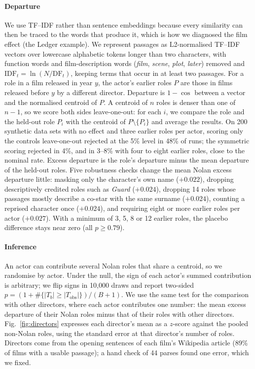 \documentclass[9pt,twocolumn,twoside]{pnas-new}
\begin{document}
{\paragraph*{Departure} We use TF--IDF rather than sentence embeddings because every similarity can then be traced to the words that produce it, which is how we diagnosed the film effect (the Ledger example). We represent passages as L2-normalised TF--IDF vectors over lowercase alphabetic tokens longer than two characters, with function words and film-description words (\emph{film}, \emph{scene}, \emph{plot}, \emph{later}) removed and $\mathrm{IDF}_t = \ln(N/\mathrm{DF}_t)$, keeping terms that occur in at least two passages. For a role in a film released in year $y$, the actor's earlier roles $P$ are those in films released before $y$ by a different director. Departure is $1 - \cos$ between a vector and the normalised centroid of $P$. A centroid of $n$ roles is denser than one of $n - 1$, so we score both sides leave-one-out: for each $i$, we compare the role and the held-out role $P_i$ with the centroid of $P \setminus \{P_i\}$ and average the results. On 200 synthetic data sets with no effect and three earlier roles per actor, scoring only the controls leave-one-out rejected at the 5\% level in 48\% of runs; the symmetric scoring rejected in 4\%, and in 3--8\% with four to eight earlier roles, close to the nominal rate. Excess departure is the role's departure minus the mean departure of the held-out roles. Five robustness checks change the mean Nolan excess departure little: masking only the character's own name ($+0.022$), dropping descriptively credited roles such as \emph{Guard} ($+0.024$), dropping 14 roles whose passages mostly describe a co-star with the same surname ($+0.024$), counting a reprised character once ($+0.024$), and requiring eight or more earlier roles per actor ($+0.027$). With a minimum of 3, 5, 8 or 12 earlier roles, the placebo difference stays near zero (all $p \geq 0.79$).

\paragraph*{Inference} An actor can contribute several Nolan roles that share a centroid, so we randomise by actor. Under the null, the sign of each actor's summed contribution is arbitrary; we flip signs in 10{,}000 draws and report two-sided $p = (1 + \#\{|T_b| \geq |T_{\mathrm{obs}}|\})/(B + 1)$. We use the same test for the comparison with other directors, where each actor contributes one number: the mean excess departure of their Nolan roles minus that of their roles with other directors. Fig.~\ref{fig:directors} expresses each director's mean as a $z$-score against the pooled non-Nolan roles, using the standard error at that director's number of roles. Directors come from the opening sentences of each film's Wikipedia article (89\% of films with a usable passage); a hand check of 44 parses found one error, which we fixed.

}
\end{document}
